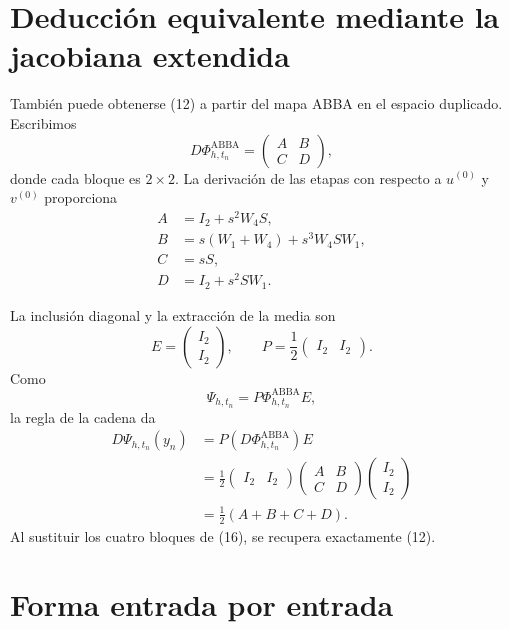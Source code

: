 \documentclass[11pt,a4paper]{article}
\newcommand{\Id}{I}
\newcommand{\PhiAB}{\Phi^{\mathrm{ABBA}}_{h,t_n}}
\begin{document}
\section{Deducción equivalente mediante la jacobiana extendida}

También puede obtenerse (12) a partir del mapa ABBA en el espacio duplicado.
Escribimos
\[
 D\PhiAB=
 \begin{pmatrix}
  A&B\\
  C&D
 \end{pmatrix},
 \tag{15}
\]
donde cada bloque es \(2\times2\). La derivación de las etapas con respecto a
\(u^{(0)}\) y \(v^{(0)}\) proporciona
\[
 \boxed{
 \begin{aligned}
 A&=\Id_2+s^2W_4S,\\
 B&=s(W_1+W_4)+s^3W_4SW_1,\\
 C&=sS,\\
 D&=\Id_2+s^2SW_1.
 \end{aligned}}
 \tag{16}
\]

La inclusión diagonal y la extracción de la media son
\[
 E=
 \begin{pmatrix}
  \Id_2\\ \Id_2
 \end{pmatrix},
 \qquad
 P=\frac12
 \begin{pmatrix}
  \Id_2&\Id_2
 \end{pmatrix}.
 \tag{17}
\]
Como
\[
 \Psi_{h,t_n}=P\PhiAB E,
\]
la regla de la cadena da
\begin{align*}
 D\Psi_{h,t_n}(y_n)
 &=P(D\PhiAB)E\\
 &=\frac12
 \begin{pmatrix}
  \Id_2&\Id_2
 \end{pmatrix}
 \begin{pmatrix}
  A&B\\
  C&D
 \end{pmatrix}
 \begin{pmatrix}
  \Id_2\\ \Id_2
 \end{pmatrix}\\
 &=\boxed{\frac12(A+B+C+D)}.
 \tag{18}
\end{align*}
Al sustituir los cuatro bloques de (16), se recupera exactamente (12).

\section{Forma entrada por entrada}
\end{document}
